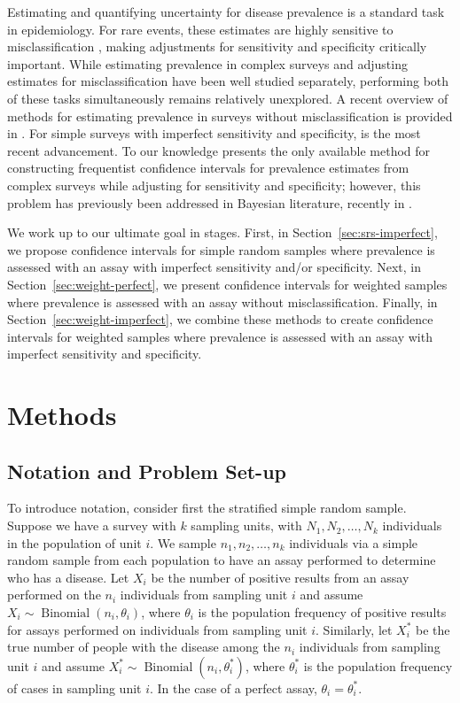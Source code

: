 \documentclass[AMA,STIX1COL]{WileyNJD-v2}
\begin{document}
Estimating and quantifying uncertainty for disease prevalence is a standard task in epidemiology.
For rare events, these estimates are highly sensitive to misclassification \cite{hemenwaySelfDefense}, making adjustments for sensitivity and specificity critically important.
While estimating prevalence in complex surveys and adjusting estimates for misclassification have been well studied separately, performing both of these tasks simultaneously remains relatively unexplored.
A recent overview of methods for estimating prevalence in surveys without misclassification is provided in \cite{Dean:2015}.
For simple surveys with imperfect sensitivity and specificity, \cite{Lang:2014} is the most recent advancement.
To our knowledge \cite{Kali:2021} presents the only available method for constructing frequentist confidence intervals for prevalence estimates from complex surveys while adjusting for sensitivity and specificity; however,
this problem has previously been addressed in Bayesian literature, recently in \cite{GelmanBayes}.

We work up to our ultimate goal in stages.
First, in Section~\ref{sec:srs-imperfect}, we propose confidence intervals for simple random samples where prevalence is assessed with an assay with imperfect sensitivity and/or specificity.
Next, in Section~\ref{sec:weight-perfect}, we present confidence intervals for weighted samples where prevalence is assessed with an assay without misclassification.
Finally, in Section~\ref{sec:weight-imperfect}, we combine these methods to create confidence intervals for weighted samples where prevalence is assessed with an assay with imperfect sensitivity and specificity.


\section{Methods}

\subsection{Notation and Problem Set-up}

To introduce notation, consider first the stratified simple random sample.
Suppose we have a survey with  \( k \) sampling units, with \( N_1, N_2, \ldots, N_k \) individuals in the population of unit \( i \).
We sample \( n_1, n_2, \ldots, n_k \) individuals via a simple random sample from each population to have an assay performed to determine who has a disease.
Let \( X_i \) be the number of positive results from an assay performed on the \( n_i \) individuals from sampling unit \( i \) and assume \( X_i \sim \operatorname{Binomial}(n_i, \theta_i) \), where \( \theta_i \) is the population frequency of positive results for assays performed on individuals from sampling unit \( i \).
Similarly, let \( X_i^* \) be the true number of people with the disease among the \( n_i \) individuals from sampling unit \( i \) and assume \( X_i^* \sim \operatorname{Binomial}(n_i, \theta_i^*) \), where \( \theta_i^* \) is the population frequency of cases in sampling unit \( i \).
In the case of a perfect assay, \( \theta_i = \theta_i^* \).
\end{document}
